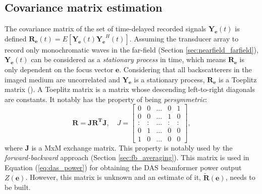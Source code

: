 \subsection{Covariance matrix estimation}
\label{sec:covariance_estimation}
The covariance matrix of the set of time-delayed recorded signals $\boldsymbol{Y_e}(t)$ is defined $\boldsymbol{R_e}(t) = E[\boldsymbol{Y_e}(t) \boldsymbol{Y_e}^H(t)]$.
Assuming the transducer array to record only monochromatic waves in the far-field (Section \ref{sec:nearfield_farfield}), $\boldsymbol{Y_e}(t)$ can be considered as a \textit{stationary process} in time, which means $\boldsymbol{R_e}$ is only dependent on the focus vector $\boldsymbol{e}$. Considering that all backscatterers in the imaged medium are uncorrelated and $\boldsymbol{Y_e}$ is a stationary process, $\boldsymbol{R_e}$ is a Toeplitz matrix (\cite{van_trees}). A Toeplitz matrix is a matrix whose descending left-to-right diagonals are constants. It notably has the property of being \textit{persymmetric}:
\begin{equation}
    \boldsymbol{R} = \boldsymbol{JR^TJ}, \quad J = \begin{bmatrix}
    0 & 0 & ... & 0 & 1 \\
    0 & 0 & ... & 1 & 0 \\
    : & : & ... & : & : \\
    0 & 1 & ... & 0 & 0 \\
    1 & 0 & ... & 0 & 0
    \end{bmatrix},
\label{eq:persymmetric}
\end{equation}
\noindent
where $\boldsymbol{J}$ is a MxM exchange matrix. This property is notably used by the \textit{forward-backward} approach (Section \ref{sec:fb_averaging}).
\noindent
This matrix is used in Equation (\ref{eq:das_power}) for obtaining the DAS beamformer power output $Z(\boldsymbol{e})$. However, this matrix is unknown and an estimate of it, $\boldsymbol{\tilde{R}(e)}$, needs to be built.

